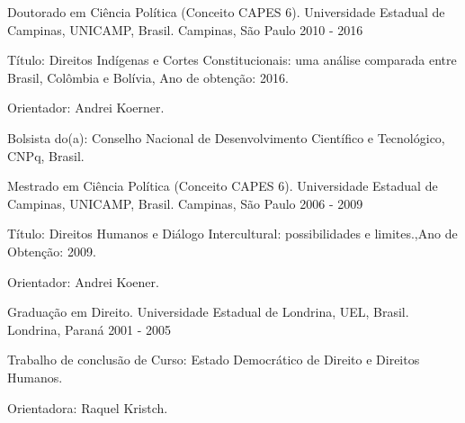 \begin{cventries}
\cventry
{Doutorado em Ciência Política (Conceito CAPES 6).} %
{Universidade Estadual de Campinas, UNICAMP, Brasil.} %
{Campinas, São Paulo} %
{2010 - 2016} %
{
  \begin{cvitems} %
    \item Título: Direitos Indígenas e Cortes Constitucionais: uma análise comparada entre Brasil, Colômbia e Bolívia, Ano de obtenção: 2016.
    \item Orientador: Andrei Koerner.
    \item Bolsista do(a): Conselho Nacional de Desenvolvimento Científico e Tecnológico, CNPq, Brasil.
  \end{cvitems}
}

\cventry
{Mestrado em Ciência Política (Conceito CAPES 6).}
{Universidade Estadual de Campinas, UNICAMP, Brasil.}
{Campinas, São Paulo}
{2006 - 2009}
{
\begin{cvitems}
  \item Título: Direitos Humanos e Diálogo Intercultural: possibilidades e limites.,Ano de Obtenção: 2009.
  \item Orientador: Andrei Koener.
 \end{cvitems}
}

\cventry
{Graduação em Direito.}
{Universidade Estadual de Londrina, UEL, Brasil.}
{Londrina, Paraná}
{2001 - 2005}
{
\begin{cvitems}
  \item Trabalho de conclusão de Curso: Estado Democrático de Direito e Direitos Humanos.
  \item Orientadora: Raquel Kristch.
 \end{cvitems}
}

\end{cventries}

